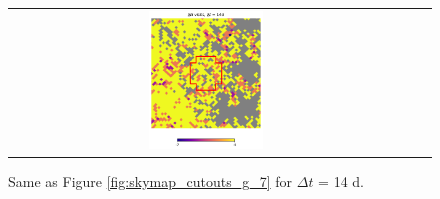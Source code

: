 \documentclass[preprintm,linenumbers]{aastex631}
\begin{document}
\begin{figure}
\begin{tabular}{  c c c}
				\includegraphics[width=0.3\textwidth]{results/skymaps_cutout/skymaps_cutout_delta_first_year_one_snap_v4_0_10yrs_db_noDD_noTwi_tscale-14_nside-256_doAllTemplateMetrics_reduceCount_g_GP_noDD_noTwi.pdf} \\
			\end{tabular}
			\caption{
   Same as Figure \ref{fig:skymap_cutouts_g_7} for $\Delta t$ = 14 d. 
    }
	\label{fig:skymap_cutouts_g_14}
		\end{figure}
\end{document}
